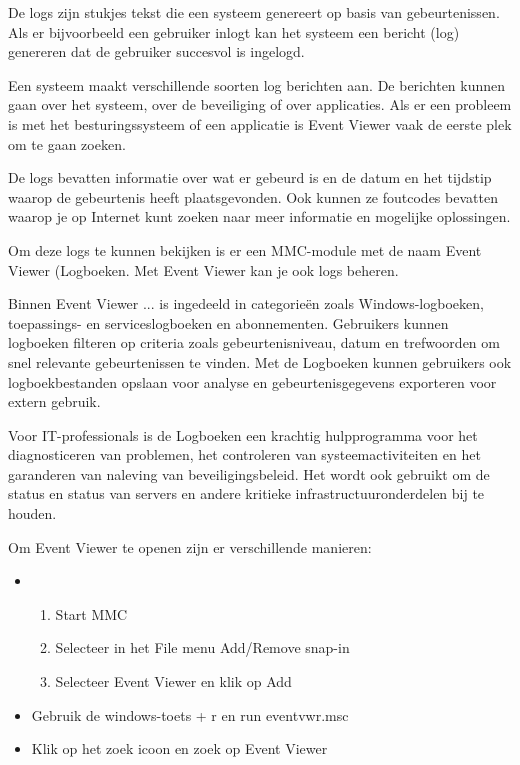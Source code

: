 De logs zijn stukjes tekst die een systeem genereert op basis van gebeurtenissen. Als er bijvoorbeeld een gebruiker inlogt kan het systeem een bericht (log) genereren dat de gebruiker succesvol is ingelogd.

Een systeem maakt verschillende soorten log berichten aan. De berichten kunnen gaan over het systeem, over de beveiliging of over applicaties. Als er een probleem is met het besturingssysteem of een applicatie is Event Viewer vaak de eerste plek om te gaan zoeken.

De logs bevatten informatie over wat er gebeurd is en de datum en het tijdstip waarop de gebeurtenis heeft plaatsgevonden. Ook kunnen ze foutcodes bevatten waarop je op Internet kunt zoeken naar meer informatie en mogelijke oplossingen.

Om deze logs te kunnen bekijken is er een MMC-module met de naam Event Viewer (Logboeken. Met Event Viewer kan je ook logs beheren.

Binnen Event Viewer ...
is ingedeeld in categorieën zoals Windows-logboeken, toepassings- en serviceslogboeken en abonnementen. Gebruikers kunnen logboeken filteren op criteria zoals gebeurtenisniveau, datum en trefwoorden om snel relevante gebeurtenissen te vinden. Met de Logboeken kunnen gebruikers ook logboekbestanden opslaan voor analyse en gebeurtenisgegevens exporteren voor extern gebruik.

Voor IT-professionals is de Logboeken een krachtig hulpprogramma voor het diagnosticeren van problemen, het controleren van systeemactiviteiten en het garanderen van naleving van beveiligingsbeleid. Het wordt ook gebruikt om de status en status van servers en andere kritieke infrastructuuronderdelen bij te houden.

Om Event Viewer te openen zijn er verschillende manieren:
\begin{itemize}
\item
	\begin{enumerate}
		\item Start MMC
		\item Selecteer in het File menu Add/Remove snap-in
		\item Selecteer Event Viewer en klik op Add
	\end{enumerate}
\item Gebruik de windows-toets + r en run eventvwr.msc
\item Klik op het zoek icoon en zoek op Event Viewer
\end{itemize}


